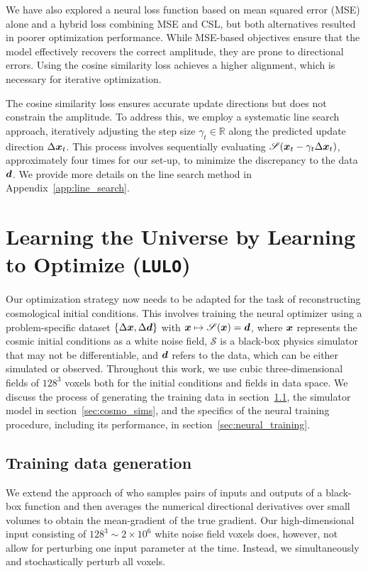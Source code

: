 We have also explored a neural loss function based on mean squared error (MSE) alone and a hybrid loss combining MSE and CSL, but both alternatives resulted in poorer optimization performance. While MSE-based objectives ensure that the model effectively recovers the correct amplitude, they are prone to directional errors. Using the cosine similarity loss achieves a higher alignment, which is necessary for iterative optimization. 

The cosine similarity loss ensures accurate update directions but does not constrain the amplitude. To address this, we employ a systematic line search approach, iteratively adjusting the step size $\gamma_t \in \mathbb{R}$ along the predicted update direction $\Delta \boldsymbol{x}_t$. This process involves sequentially evaluating $\mathscr{S}(\boldsymbol{x}_t - \gamma_t\Delta \boldsymbol{x}_t)$, approximately four times for our set-up, to minimize the discrepancy to the data $\boldsymbol{d}$. We provide more details on the line search method in Appendix~\ref{app:line_search}. 

\section{Learning the Universe by Learning to Optimize (\texttt{LULO})}
\label{sec:L20_cosmo}

Our optimization strategy now needs to be adapted for the task of reconstructing cosmological initial conditions. This involves training the neural optimizer using a problem-specific dataset $\{\Delta \boldsymbol{x}, \Delta \boldsymbol{d}\}$ with $\boldsymbol{x}\mapsto \mathscr{S}(\boldsymbol{x})=\boldsymbol{d}$, where $\boldsymbol{x}$ represents the cosmic initial conditions as a white noise field, $\mathscr{S}$ is a black-box physics simulator that may not be differentiable, and $\boldsymbol{d}$ refers to the data, which can be either simulated or observed. Throughout this work, we use cubic three-dimensional fields of $128^3$ voxels both for the initial conditions and fields in data space. We discuss the process of generating the training data in section~\ref{sec:training_data}, the simulator model in section~\ref{sec:cosmo_sims}, and the specifics of the neural training procedure, including its performance, in section~\ref{sec:neural_training}.

\subsection{Training data generation}
\label{sec:training_data}

We extend the approach of \citet{Sarafian2020} who samples pairs of inputs and outputs of a black-box function and then averages the numerical directional derivatives over small volumes to obtain the mean-gradient of the true gradient. Our high-dimensional input consisting of $128^3 \sim 2\times10^6$ white noise field voxels does, however, not allow for perturbing one input parameter at the time. Instead, we simultaneously and stochastically perturb all voxels.

